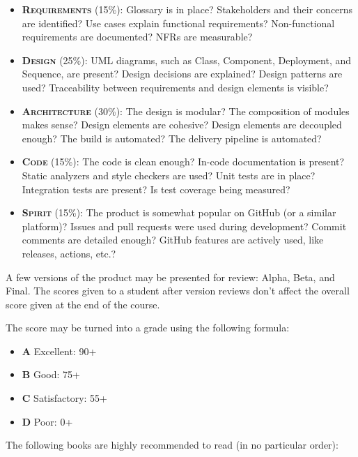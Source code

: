 \documentclass[nobrand,anonymous,nodate,nosecurity]{huawei}
\begin{document}
\begin{itemize}
\item {\bfseries\scshape Requirements} (15\%):
  Glossary is in place?
  Stakeholders and their concerns are identified?
  Use cases explain functional requirements?
  Non-functional requirements are documented?
  NFRs are measurable?
\item {\bfseries\scshape Design} (25\%):
  UML diagrams, such as Class, Component, Deployment, and Sequence, are present?
  Design decisions are explained?
  Design patterns are used?
  Traceability between requirements and design elements is visible?
\item {\bfseries\scshape Architecture} (30\%):
  The design is modular?
  The composition of modules makes sense?
  Design elements are cohesive?
  Design elements are decoupled enough?
  The build is automated?
  The delivery pipeline is automated?
\item {\bfseries\scshape Code} (15\%):
  The code is clean enough?
  In-code documentation is present?
  Static analyzers and style checkers are used?
  Unit tests are in place?
  Integration tests are present?
  Is test coverage being measured?
\item {\bfseries\scshape Spirit} (15\%):
  The product is somewhat popular on GitHub (or a similar platform)?
  Issues and pull requests were used during development?
  Commit comments are detailed enough?
  GitHub features are actively used, like releases, actions, etc.?
\end{itemize}

A few versions of the product may be presented for review:
Alpha, Beta, and Final. The scores given to a student
after version reviews don't affect the overall
score given at the end of the course.

The score may be turned into a grade using the following formula:

\begin{itemize}
\item \textbf{A} Excellent: 90+
\item \textbf{B} Good: 75+
\item \textbf{C} Satisfactory: 55+
\item \textbf{D} Poor: 0+
\end{itemize}

The following books are highly recommended to read (in no particular order):
\end{document}
